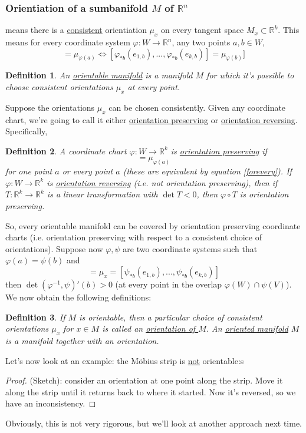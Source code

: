 \documentclass{article}
\newtheorem{definition}{Definition}
\newcommand{\reals}[0]{\mathbb{R}}
\begin{document}
\subsubsection{Orientiation of a sumbanifold \(M\) of \(\reals^n\)}
means there is a \underline{consistent} orientiation \(\mu_x\) on every tangent space \(M_x \subset \reals^k\). This means for every coordinate system \(\varphi: W \to \reals^n\), any two points \(a, b \in W\),
\begin{equation}
  [\varphi_{*a}(e_{1,a}),...,\varphi_{*a}(e_{k,a})] = \mu_{\varphi(a)} \iff [\varphi_{*b}(e_{1,b}),...,\varphi_{*b}(e_{k,b})] = \mu_{\varphi(b)}]
  \label{forevery}
\end{equation}
\begin{definition}
  An \underline{orientable manifold} is a manifold \(M\) for which it's possible to choose consistent orientations \(\mu_x\) at every point.
\end{definition}
Suppose the orientations \(\mu_x\) can be chosen consistently. Given any coordinate chart, we're going to call it either \underline{orientation preserving} or \underline{orientation reversing}. Specifically,
\begin{definition}
  A coordinate chart \(\varphi: W \to \reals^k\) is \underline{orientation preserving} if
  \begin{equation}
    [\varphi_{*a}(e_{1,a}),...,\varphi_{*a}(e_{k, a})] = \mu_{\varphi(a)}
  \end{equation}
  for one point \(a\) or every point \(a\) (these are equivalent by equation \ref{forevery}).
  If \(\varphi: W \to \reals^k\) is \underline{orientation reversing} (i.e. not orientation preserving), then if \(T: \reals^k \to \reals^k\) is a linear transformation with \(\det T < 0\), then \(\varphi \circ T\) is orientation preserving.
\end{definition}
So, every orientable manifold can be covered by orientation preserving coordinate charts (i.e. orientation preserving with respect to a consistent choice of orientations). Suppose now \(\varphi, \psi\) are two coordinate systems such that \(\varphi(a) = \psi(b)\) and
\begin{equation}
  [\varphi_{*a}(e_{1,a}),...,\varphi_{*b}(e_{k, a})] = \mu_x = [\psi_{*b}(e_{1,b}),...,\psi_{*b}(e_{k,b})]
\end{equation}
then \(\det(\varphi^{-1}, \psi)'(b) > 0\) (at every point in the overlap \(\varphi(W) \cap \psi(V)\)). We now obtain the following definitions:
\begin{definition}
If \(M\) is orientable, then a particular choice of consistent orientations \(\mu_x\) for \(x \in M\) is called an \underline{orientation of \(M\)}. An \underline{oriented manifold} \(M\) is a manifold together with an orientation.
\end{definition}
Let's now look at an example: the Möbius strip is \underline{not} orientable:s
\begin{proof} (Sketch): consider an orientation at one point along the strip. Move it along the strip until it returns back to where it started. Now it's reversed, so we have an inconsistency.
\end{proof}
Obviously, this is not very rigorous, but we'll look at another approach next time.
\end{document}
